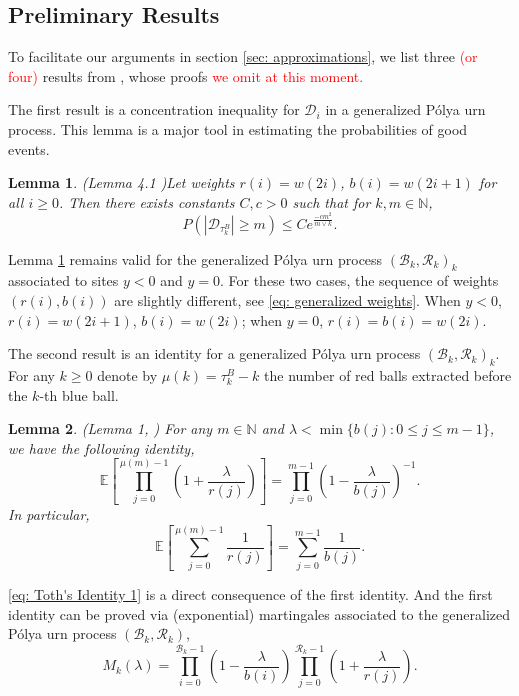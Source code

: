 \documentclass[twoside,12pt,a4paper]{article}
\newtheorem{lemma}{Lemma}[section]
\numberwithin{equation}{section}
\newcommand{\abs}[1]{\left\vert #1 \right\vert}
\begin{document}
{		\subsection{Preliminary Results}
		To facilitate our arguments in section \ref{sec: approximations}, we list three \textcolor{red}{(or four)} results from \cite{KMP22,T96}, whose proofs \textcolor{red}{we omit at this moment.}
		
		The first result is a concentration inequality for $\mathcal{D}_i$ in a generalized P\'{o}lya urn process. This lemma is a major tool in estimating the probabilities of good events.
		\begin{lemma}(Lemma 4.1 \cite{KMP22})\label{lm: concentration inequality}
			Let weights $r(i) = w(2i)$, $b(i)= w(2i+1) $ for all $i\geq 0$. Then there exists constants $C,c>0$ such that for $k, m \in \mathbb{N}$,
			$$
			P\left(  \abs{ \mathcal{D}_{\tau_k^B}   } \geq m \right) \leq C e^{\frac{-cm^2}{m \vee k}}.
			$$
		\end{lemma} 
		Lemma \ref{lm: concentration inequality} remains valid for the generalized P\'{o}lya urn process $(\mathcal{B}_{k},\mathcal{R}_{k})_k$ associated to sites $y<0$ and $y=0$. For these two cases, the sequence of weights $(r(i),b(i))$ are slightly different, see \eqref{eq: generalized weights}. When $y<0$, $r(i) = w(2i+1)$, $b(i)= w(2i) $; when $y=0$, $r(i) = b(i)=w(2i)$.
		
		The second result is an identity for a generalized P\'{o}lya urn process $(\mathcal{B}_{k},\mathcal{R}_{k})_k$. For any $k\geq 0$ denote by $\mu(k)= \tau^B_k - k$ the number of red balls extracted before the $k$-th blue ball. 
		\begin{lemma}(Lemma 1, \cite{T96}) \label{lm: Toth's Identity}
			For any $m\in \mathbb{N}$ and $\lambda < \min\{ b(j): 0\leq j\leq m-1 \}$, we have the following identity,
			$$  \mathbb{E}\left[  \prod_{j=0}^{ \mu(m)-1 } \left(1+ \frac{\lambda}{r(j)}   \right) \right] =   \prod_{j=0}^{ m-1 } \left(1- \frac{\lambda}{b(j)}   \right)^{-1}.   $$ 
			In particular, 
			\begin{equation}\label{eq: Toth's Identity 1}
				\mathbb{E}\left[  \sum_{j=0}^{ \mu(m)-1 } \frac{1}{r(j)}   \right] =   \sum_{j=0}^{ m-1 } \frac{1}{b(j)}.
			\end{equation}	
		\end{lemma}
		\eqref{eq: Toth's Identity 1} is a direct consequence of the first identity. And the first identity can be proved via (exponential) martingales associated to the generalized P\'{o}lya urn process $(\mathcal{B}_{k},\mathcal{R}_{k})$, 
		$$M_k(\lambda) = \prod_{i=0}^{ \mathcal{B}_{k}-1 } \left(1-\frac{\lambda}{b(i)}\right) \prod_{j=0}^{\mathcal{R}_{k}-1 } \left(1+\frac{\lambda}{r(j)}\right). $$
		
}
\end{document}
